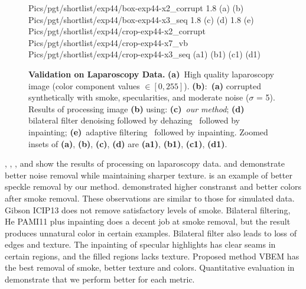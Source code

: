 \begin{figure}[!h]
     {Pics/pgt/shortlist/exp44/box-exp44-x2_corrupt}  {1.8} {(a)} {(b)}
     {Pics/pgt/shortlist/exp44/box-exp44-x3_seq} {1.8} {(c)} {(d)}
     {1.8} {(e)}
     {Pics/pgt/shortlist/exp44/crop-exp44-x2_corrupt} {Pics/pgt/shortlist/exp44/crop-exp44-x7_vb} {Pics/pgt/shortlist/exp44/crop-exp44-x3_seq}  {(a1)} {(b1)} {(c1)} {(d1)}
    \caption
    {
        {\bf Validation on Laparoscopy Data. }
        {\bf (a)}~High quality laparoscopy image (color component values $\in [0,255]$).
        {\bf (b)}:~{\bf (a)} corrupted synthetically with smoke, specularities, and moderate noise ($\sigma$ = 5).
        Results of processing image {\bf (b)} using:
        {\bf (c)}~{\em our method};
        {\bf (d)}~ bilateral filter denoising followed by dehazing~\cite{he2011dark} followed by inpainting;
        {\bf (e)}~adaptive filtering~\cite{gibson2013wiener} followed by inpainting.
        Zoomed insets of {\bf (a)}, {\bf (b)}, {\bf (c)}, {\bf (d)} are {\bf (a1)}, {\bf (b1)}, {\bf (c1)}, {\bf (d1)}.
    }
    \label{fig:imagesPgt4}
\end{figure}


, , , and  show the results of processing on laparoscopy data.  and  demonstrate better noise removal while maintaining sharper texture. is an example of better speckle removal by our method.  demonstrated higher constranst and better colors after smoke removal. These observations are similar to those for simulated data. Gibson ICIP13 \cite{gibson2013wiener} does not remove satisfactory levels of smoke. Bilateral filtering, He PAMI11 \cite{he2011dark} plus inpainting does a decent job at smoke removal, but the result produces unnatural color in certain examples. Bilateral filter also leads to loss of edges and texture. The inpainting of specular highlights has clear seams in certain regions, and the filled regions lacks texture. Proposed method VBEM has the best removal of smoke, better texture and colors. Quantitative evaluation in  demonstrate that we perform better for each metric.

